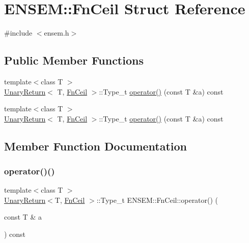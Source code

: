 \hypertarget{structENSEM_1_1FnCeil}{}\section{E\+N\+S\+EM\+:\+:Fn\+Ceil Struct Reference}
\label{structENSEM_1_1FnCeil}


{\ttfamily \#include $<$ensem.\+h$>$}

\subsection*{Public Member Functions}
\begin{DoxyCompactItemize}
\item 
{\footnotesize template$<$class T $>$ }\\\mbox{\hyperlink{structENSEM_1_1UnaryReturn}{Unary\+Return}}$<$ T, \mbox{\hyperlink{structENSEM_1_1FnCeil}{Fn\+Ceil}} $>$\+::Type\+\_\+t \mbox{\hyperlink{structENSEM_1_1FnCeil_acaee8f3349fe23a961345ed93b8c7bc4}{operator()}} (const T \&a) const
\item 
{\footnotesize template$<$class T $>$ }\\\mbox{\hyperlink{structENSEM_1_1UnaryReturn}{Unary\+Return}}$<$ T, \mbox{\hyperlink{structENSEM_1_1FnCeil}{Fn\+Ceil}} $>$\+::Type\+\_\+t \mbox{\hyperlink{structENSEM_1_1FnCeil_acaee8f3349fe23a961345ed93b8c7bc4}{operator()}} (const T \&a) const
\end{DoxyCompactItemize}


\subsection{Member Function Documentation}
\mbox{\label{structENSEM_1_1FnCeil_acaee8f3349fe23a961345ed93b8c7bc4}} 
\subsubsection{\texorpdfstring{operator()()}{operator()()}\hspace{0.1cm}{\footnotesize\ttfamily [1/2]}}
{\footnotesize\ttfamily template$<$class T $>$ \\
\mbox{\hyperlink{structENSEM_1_1UnaryReturn}{Unary\+Return}}$<$T, \mbox{\hyperlink{structENSEM_1_1FnCeil}{Fn\+Ceil}} $>$\+::Type\+\_\+t E\+N\+S\+E\+M\+::\+Fn\+Ceil\+::operator() (\begin{DoxyParamCaption}\item[{const T \&}]{a }\end{DoxyParamCaption}) const\hspace{0.3cm}{\ttfamily [inline]}}

